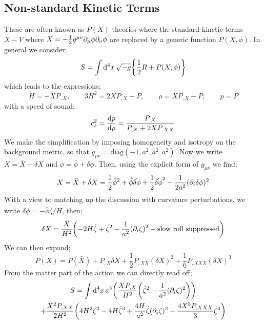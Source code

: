 \subsection{Non-standard Kinetic Terms}
These are often known as $P(X)$ theories where the standard kinetic terms $X - V$ where $X = -\tfrac{1}{2}g^{\mu\nu}\partial_\mu \phi \partial_\nu \phi$ are replaced by a generic function $P(X, \phi)$. In general we consider;
\begin{equation}
S = \int{\upd{^4 x} \sqrt{-g}\set{\frac{1}{2}R + P(X, \phi)}}
\end{equation}
which leads to the expressions;
\begin{equation}
\dot{H} = - X P_{,X} , \qquad 3H^2 = 2XP_{,X} - P, \qquad \rho = X P_{, X} - P , \qquad p = P
\end{equation}
with a speed of sound;
\begin{equation}
c_s^2 = \frac{\text{d} p}{\text{d} \rho} = \frac{P_{,X}}{P_{, X} + 2X P_{, XX}}
\end{equation}
We make the simplification by imposing homogeneity and isotropy on the background metric, so that $g_{\mu\nu} = \text{diag}(-1, a^2, a^2, a^2)$. Now we write $X = \bar{X} + \delta X$ and $\phi = \bar{\phi} + \delta \phi$. Then, using the explicit form of $g_{\mu\nu}$ we find;
\begin{equation*}
X = \bar{X} + \delta X = \frac{1}{2}\dot{\bar{\phi}}^2 + \dot{\bar{\phi}} \dot{\delta \phi} + \frac{1}{2}\dot{\delta \phi}^2 - \frac{1}{2a^2}(\partial_i \delta \phi)^2
\end{equation*}
With a view to matching up the discussion with curvature perturbations, we write $\delta \phi = - \dot{\bar{\phi}}\zeta/H$, then;
\begin{equation*}
\delta X = \frac{\bar{X}}{H^2} \left(- 2H \dot{\zeta} + \dot{\zeta}^2 - \frac{1}{a^2}(\del_i \zeta)^2 + \text{slow roll suppressed}\right)
\end{equation*}
We can then expand;
\begin{equation*}
P(X) = P(\bar{X}) + P_{,X}\delta X + \frac{1}{2}P_{, XX}(\delta X)^2 + \frac{1}{6}P_{,XXX}(\delta X)^3
\end{equation*}
From the matter part of the action we can directly read off;
\begin{multline}
S = \int{\upd{^4 x}} a^3 \left(\frac{XP_{,X}}{H^2}\left(\dot{\zeta}^2 - \frac{1}{a^2}(\del_i \zeta)^2\right)\right) \\ + \frac{X^2P_{, XX}}{2H^2}\left(4H^2 \dot{\zeta}^2 - 4H\dot{\zeta}^3 + \frac{4H}{a^2}\dot{\zeta}(\del_i \zeta)^2 - \frac{4X^3 P_{, XXX}}{3}\dot{\zeta}^3\right)
\end{multline}
